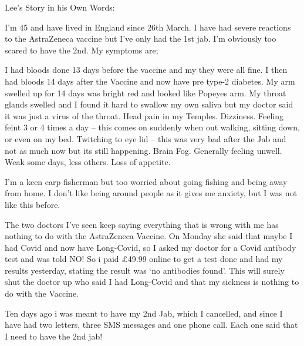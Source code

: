 Lee’s Story in his Own Words:

I’m 45 and have lived in England since 26th March. I have had severe reactions
to the AstraZeneca vaccine but I’ve only had the 1st jab. I’m obviously too
scared to have the 2nd. My symptoms are;

I had bloods done 13 days before the vaccine and my they were all fine. I then
had bloods 14 days after the Vaccine and now have pre type-2 diabetes. My arm
swelled up for 14 days was bright red and looked like Popeyes arm.  My throat
glands swelled and I found it hard to swallow my own saliva but my doctor said
it was just a virus of the throat.  Head pain in my Temples.  Dizziness.
Feeling feint 3 or 4 times a day – this comes on suddenly when out walking,
sitting down, or even on my bed.  Twitching to eye lid – this was very bad after
the Jab and not as much now but its still happening.  Brain Fog.  Generally
feeling unwell.  Weak some days, less others.  Loss of appetite.

I’m a keen carp fisherman but too worried about going fishing and being away
from home. I don’t like being around people as it gives me anxiety, but I was
not like this before.

The two doctors I’ve seen keep saying everything that is wrong with me has
nothing to do with the AstraZeneca Vaccine. On Monday she said that maybe I had
Covid and now have Long-Covid, so I asked my doctor for a Covid antibody test
and was told NO! So i paid £49.99 online to get a test done and had my results
yesterday, stating the result was ‘no antibodies found’. This will surely shut
the doctor up who said I had Long-Covid and that my sickness is nothing to do
with the Vaccine.

Ten days ago i was meant to have my 2nd Jab, which I cancelled, and since I have
had two letters, three SMS messages and one phone call. Each one said that I
need to have the 2nd jab!

